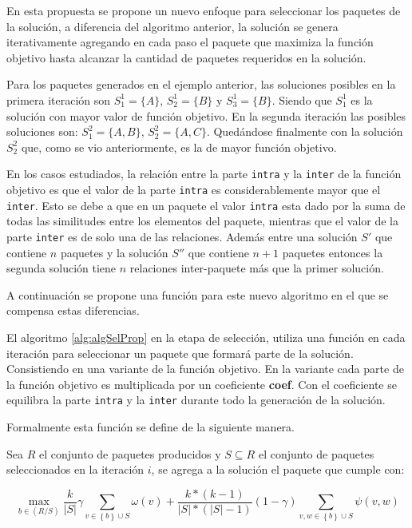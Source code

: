 En esta propuesta se propone un nuevo enfoque para seleccionar los paquetes de la solución, a diferencia del algoritmo anterior, la solución se genera iterativamente agregando en cada paso el paquete que maximiza la función objetivo hasta alcanzar la cantidad de paquetes requeridos en la solución.

Para los paquetes generados en el ejemplo anterior, las soluciones posibles en la primera iteración son $S^{1}_{1}=\{A\}$, $S^{1}_{2}=\{B\}$ y $S^{1}_{3}=\{B\}$. Siendo que $S^{1}_{1}$ es la solución con mayor valor de función objetivo. En la segunda iteración las posibles soluciones son:  $S^{2}_{1}=\{A,B\}$, $S^{2}_{2}=\{A,C\}$. Quedándose finalmente con la solución $S^{2}_{2}$ que, como se vio anteriormente, es la de mayor función objetivo.

En los casos estudiados, la relación entre la parte \texttt{intra} y la \texttt{inter} de la función objetivo es que el valor de la parte \texttt{intra} es considerablemente mayor que el \texttt{inter}. Esto se debe a que en un paquete el valor \texttt{intra} esta dado por la suma de todas las similitudes entre los elementos del paquete, mientras que el valor de la parte \texttt{inter} es de solo una de las relaciones. Además entre una solución $S'$ que contiene $n$ paquetes y la solución $S''$ que contiene $n+1$ paquetes entonces la segunda solución tiene $n$ relaciones inter-paquete más que la primer solución. 

A continuación se propone una función para este nuevo algoritmo en el que se compensa estas diferencias.

El algoritmo \ref{alg:algSelProp} en la etapa de selección, utiliza una función en cada iteración para seleccionar un paquete que formará parte de la solución. Consistiendo en una variante de la función objetivo. En la variante cada parte de la función objetivo es multiplicada por un coeficiente \textbf{coef}. Con el coeficiente se equilibra la parte \texttt{intra} y la \texttt{inter} durante todo la generación de la solución.   

Formalmente esta función se define de la siguiente manera.

Sea $R$ el conjunto de paquetes producidos y $S \subseteq R$ el conjunto de paquetes seleccionados en la iteración $i$, se agrega a la solución el paquete que cumple con:

\begin{equation}
\max_{b \in (R/S)}{\dfrac{k}{|S|}} \gamma \sum_{v \in \left\{b\right\} \cup S}{\omega(v)} + \dfrac{k * (k-1)}{|S| * (|S|-1)} (1-\gamma) \sum_{v,w \in \left\{b\right\} \cup S}{\psi(v,w)}
\end{equation}

